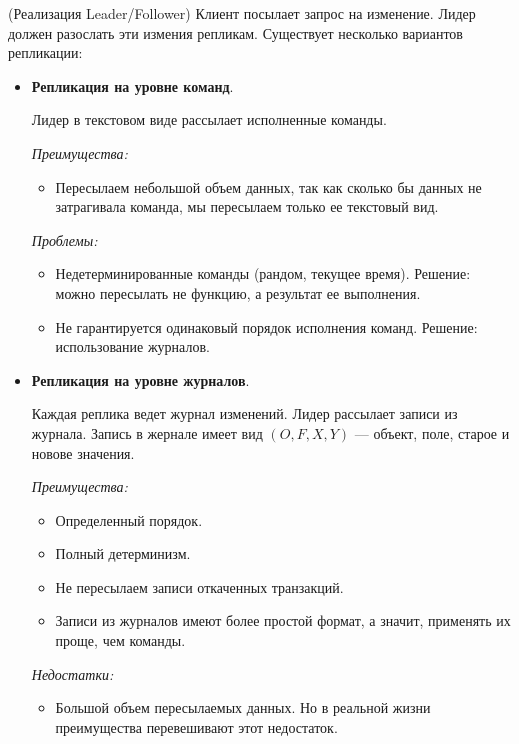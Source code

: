 \begin{algorithm}(Реализация Leader/Follower)
    Клиент посылает запрос на изменение. Лидер должен разослать эти измения репликам. Существует несколько вариантов репликации:
    \begin{itemize}
        \item \textbf{Репликация на уровне команд}.

        Лидер в текстовом виде рассылает исполненные команды.

        \textit{Преимущества:}
        \begin{itemize}
            \item Пересылаем небольшой объем данных, так как сколько бы данных не затрагивала команда, мы пересылаем только ее текстовый вид.
        \end{itemize}

        \textit{Проблемы:}
        \begin{itemize}
            \item Недетерминированные команды (рандом, текущее время). Решение: можно пересылать не функцию, а результат ее выполнения.
            \item Не гарантируется одинаковый порядок исполнения команд. Решение: использование журналов.
        \end{itemize}
        \item \textbf{Репликация на уровне журналов}.

        Каждая реплика ведет журнал изменений. Лидер рассылает записи из журнала. Запись в жернале имеет вид $(O, F, X, Y)$ --- объект, поле, старое и новове значения.

        \textit{Преимущества:}
        \begin{itemize}
            \item Определенный порядок.
            \item Полный детерминизм.
            \item Не пересылаем записи откаченных транзакций.
            \item Записи из журналов имеют более простой формат, а значит, применять их проще, чем команды.
        \end{itemize}

        \textit{Недостатки:}
        \begin{itemize}
            \item Большой объем пересылаемых данных. Но в реальной жизни преимущества перевешивают этот недостаток.
        \end{itemize}

    \end{itemize}

\end{algorithm}


